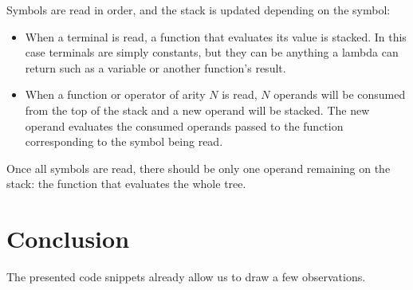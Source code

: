 \documentclass[../main]{subfiles}
\begin{document}
Symbols are read in order, and the stack is updated depending on the symbol:

\begin{itemize}
\item When a terminal is read, a function that evaluates its value is stacked.
In this case terminals are simply constants, but they can be anything a \cpp
lambda can return such as a variable or another function's result.

\item When a function or operator of arity $N$ is read, $N$ operands will be
consumed from the top of the stack and a new operand will be stacked.
The new operand evaluates the consumed operands passed to the function
corresponding to the symbol being read.
\end{itemize}

Once all symbols are read, there should be only one operand remaining
on the stack: the function that evaluates the whole tree.

\section{
  Conclusion
}


The presented code snippets already allow us to draw a few observations.
\end{document}
